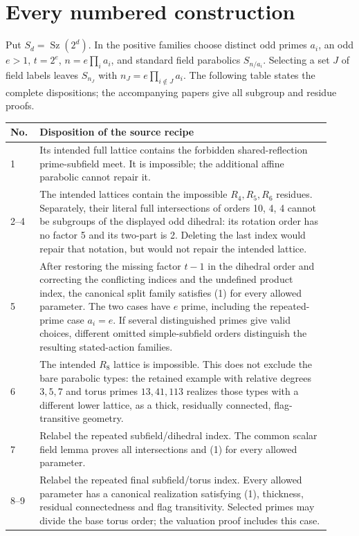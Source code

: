 \documentclass[11pt,a4paper]{article}
\newcommand{\Sz}{\operatorname{Sz}}
\begin{document}
\section{Every numbered construction}
Put $S_d=\Sz(2^d)$. In the positive families choose distinct odd primes
$a_i$, an odd $e>1$, $t=2^e$, $n=e\prod_i a_i$, and standard
field parabolics $S_{n/a_i}$. Selecting a set $J$ of field labels leaves
$S_{n_J}$ with $n_J=e\prod_{i\notin J}a_i$.
The following table states the complete dispositions; the accompanying
papers give all subgroup and residue proofs.
\begin{longtable}{p{0.08\linewidth}p{0.84\linewidth}}
\toprule
No. & Disposition of the source recipe\\\midrule\endhead
1 & Its intended full lattice contains the forbidden shared-reflection
prime-subfield meet. It is impossible; the additional affine parabolic
cannot repair it.\\
2--4 & The intended lattices contain the impossible $R_4,R_5,R_6$
residues. Separately, their literal full intersections of orders 10, 4,
4 cannot be subgroups of the displayed odd dihedral: its rotation order
has no factor 5 and its two-part is 2. Deleting the last index would
repair that notation, but would not repair the intended lattice.\\
5 & After restoring the missing factor $t-1$ in the dihedral order and
correcting the conflicting indices and the undefined product index,
the canonical split family satisfies (1) for every allowed parameter.
The two cases have $e$ prime, including the repeated-prime case $a_i=e$.
If several distinguished primes give valid choices, different omitted
simple-subfield orders distinguish the resulting stated-action families.\\
6 & The intended $R_8$ lattice is impossible. This does not exclude the
bare parabolic types: the retained example with relative degrees
$3,5,7$ and torus primes $13,41,113$ realizes those types with a different
lower lattice, as a thick, residually connected, flag-transitive geometry.\\
7 & Relabel the repeated subfield/dihedral index. The common scalar field
lemma proves all intersections and (1) for every allowed parameter.\\
8--9 & Relabel the repeated final subfield/torus index. Every allowed
parameter has a canonical realization satisfying (1), thickness,
residual connectedness and flag transitivity. Selected primes may divide
the base torus order; the valuation proof includes this case.\\

\end{longtable}
\end{document}
